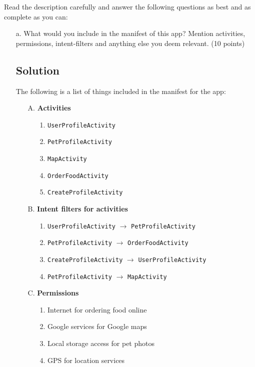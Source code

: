 \documentclass[12pt]{book}
\begin{document}
Read the description carefully and answer the following questions as best and as complete as you can:

\begin{itemize}
    \item[a.] What would you include in the manifest of this app? Mention activities, permissions, intent-filters and anything else you deem relevant. (10 points)
    
    \subsection*{Solution}

    The following is a list of things included in the manifest for the app:
    \begin{itemize}
        \item[A.] \textbf{Activities}
        \begin{itemize}
            \item[1.] \texttt{UserProfileActivity}
            \item[2.] \texttt{PetProfileActivity}
            \item[3.] \texttt{MapActivity}
            \item[4.] \texttt{OrderFoodActivity}
            \item[5.] \texttt{CreateProfileActivity}
        \end{itemize}
        \item[B.] \textbf{Intent filters for activities}
        \begin{itemize}
            \item[1.] \texttt{UserProfileActivity} $\rightarrow$ \texttt{PetProfileActivity}
            \item[2.] \texttt{PetProfileActivity} $\rightarrow$ \texttt{OrderFoodActivity}
            \item[3.] \texttt{CreateProfileActivity} $\rightarrow$ \texttt{UserProfileActivity}
            \item[4.] \texttt{PetProfileActivity} $\rightarrow$ \texttt{MapActivity}
        \end{itemize}

        \item[C.] \textbf{Permissions}
        \begin{itemize}
            \item[1.] Internet for ordering food online
            \item[2.] Google services for Google maps
            \item[3.] Local storage access for pet photos
            \item[4.] GPS for location services
        \end{itemize}
    \end{itemize}



\end{itemize}
\end{document}
